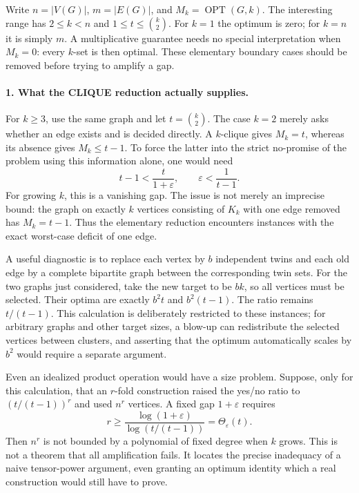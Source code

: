 \documentclass[11pt]{article}
\begin{document}
Write $n=|V(G)|$, $m=|E(G)|$, and $M_k=\operatorname{OPT}(G,k)$. The interesting range has $2\le k<n$ and $1\le t\le\binom{k}{2}$. For $k=1$ the optimum is zero; for $k=n$ it is simply $m$. A multiplicative guarantee needs no special interpretation when $M_k=0$: every $k$-set is then optimal. These elementary boundary cases should be removed before trying to amplify a gap.

\paragraph{1. What the CLIQUE reduction actually supplies.}
For $k\ge3$, use the same graph and let $t=\binom{k}{2}$. The case $k=2$ merely asks whether an edge exists and is decided directly. A $k$-clique gives $M_k=t$, whereas its absence gives $M_k\le t-1$. To force the latter into the strict no-promise of the problem using this information alone, one would need
\[
 t-1<\frac{t}{1+\varepsilon},\qquad
 \varepsilon<\frac{1}{t-1}.
\]
For growing $k$, this is a vanishing gap. The issue is not merely an imprecise bound: the graph on exactly $k$ vertices consisting of $K_k$ with one edge removed has $M_k=t-1$. Thus the elementary reduction encounters instances with the exact worst-case deficit of one edge.

A useful diagnostic is to replace each vertex by $b$ independent twins and each old edge by a complete bipartite graph between the corresponding twin sets. For the two graphs just considered, take the new target to be $bk$, so all vertices must be selected. Their optima are exactly $b^2t$ and $b^2(t-1)$. The ratio remains $t/(t-1)$. This calculation is deliberately restricted to these instances; for arbitrary graphs and other target sizes, a blow-up can redistribute the selected vertices between clusters, and asserting that the optimum automatically scales by $b^2$ would require a separate argument.

Even an idealized product operation would have a size problem. Suppose, only for this calculation, that an $r$-fold construction raised the yes/no ratio to $(t/(t-1))^r$ and used $n^r$ vertices. A fixed gap $1+\varepsilon$ requires
\[
 r\ge\frac{\log(1+\varepsilon)}{\log(t/(t-1))}
       =\Theta_{\varepsilon}(t).
\]
Then $n^r$ is not bounded by a polynomial of fixed degree when $k$ grows. This is not a theorem that all amplification fails. It locates the precise inadequacy of a naive tensor-power argument, even granting an optimum identity which a real construction would still have to prove.
\end{document}
